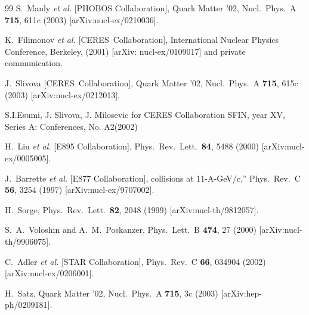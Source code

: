 \documentclass[aps,prc,superscriptaddress,showpacs,floatfix,nofootinbib]{revtex4}
\begin{document}
\begin{thebibliography}{99}
S.~Manly {\it et al.}  [PHOBOS Collaboration],
Quark Matter '02, Nucl.\ Phys.\ A {\bf 715}, 611c (2003) 
[arXiv:nucl-ex/0210036].

K.~Filimonov {\it et al.} [CERES~Collaboration], 
International Nuclear Physics Conference, Berkeley, (2001)
[arXiv: nucl-ex/0109017]
and private communication.

J.~Slivova [CERES~Collaboration],
Quark Matter '02, Nucl.\ Phys.\ A {\bf 715}, 615c (2003) 
[arXiv:nucl-ex/0212013].

S.I.Esumi, J. Slivova, J. Milosevic for CERES Collaboration
SFIN, year XV, Series A: Conferences, No. A2(2002)

H.~Liu {\it et al.}  [E895 Collaboration],
Phys.\ Rev.\ Lett.\  {\bf 84}, 5488 (2000)
[arXiv:nucl-ex/0005005].

J.~Barrette {\it et al.}  [E877 Collaboration],
collisions at 11-A-GeV/c,''
Phys.\ Rev.\ C {\bf 56}, 3254 (1997)
[arXiv:nucl-ex/9707002].

H.~Sorge,
Phys.\ Rev.\ Lett.\  {\bf 82}, 2048 (1999)
[arXiv:nucl-th/9812057].

S.~A.~Voloshin and A.~M.~Poskanzer,
Phys.\ Lett.\ B {\bf 474}, 27 (2000)
[arXiv:nucl-th/9906075].

C.~Adler {\it et al.} [STAR Collaboration], 
Phys.\ Rev.\ C {\bf 66}, 034904 (2002)
[arXiv:nucl-ex/0206001].

H.~Satz,
Quark Matter '02, Nucl.\ Phys.\ A {\bf 715}, 3c (2003) 
[arXiv:hep-ph/0209181].


\end{thebibliography}
\end{document}
